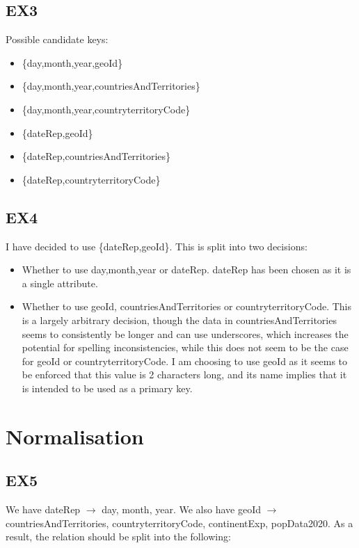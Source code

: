 \documentclass{article}
\begin{document}
\subsection{EX3}
Possible candidate keys:
\begin{itemize}
\item \{day,month,year,geoId\}
\item \{day,month,year,countriesAndTerritories\}
\item \{day,month,year,countryterritoryCode\}
\item \{dateRep,geoId\}
\item \{dateRep,countriesAndTerritories\}
\item \{dateRep,countryterritoryCode\}
\end{itemize}

\subsection{EX4}

I have decided to use \{dateRep,geoId\}. This is split into two decisions:

\begin{itemize}
\item Whether to use day,month,year or dateRep. dateRep has been chosen as it is a single attribute.
\item Whether to use geoId, countriesAndTerritories or countryterritoryCode. This is a largely arbitrary decision, though the data in countriesAndTerritories seems to consistently be longer and can use underscores, which increases the potential for spelling inconsistencies, while this does not seem to be the case for geoId or countryterritoryCode. I am choosing to use geoId as it seems to be enforced that this value is 2 characters long, and its name implies that it is intended to be used as a primary key.
\end{itemize}

\section{Normalisation}

\subsection{EX5}

We have dateRep $\rightarrow$ day, month, year. We also have geoId $\rightarrow$ countriesAndTerritories, countryterritoryCode, continentExp, popData2020. As a result, the relation should be split into the following:
\end{document}
